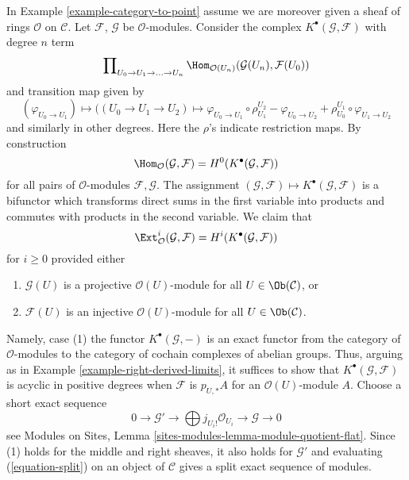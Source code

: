 \begin{example}
\label{example-computing-exts}
In Example \ref{example-category-to-point} assume we are moreover given
a sheaf of rings $\mathcal{O}$ on $\mathcal{C}$. Let
$\mathcal{F}$, $\mathcal{G}$ be $\mathcal{O}$-modules.
Consider the complex $K^\bullet(\mathcal{G}, \mathcal{F})$
with degree $n$ term
$$
\prod\nolimits_{U_0 \to U_1 \to \ldots \to U_n}
\Hom_{\mathcal{O}(U_n)}(\mathcal{G}(U_n), \mathcal{F}(U_0))
$$
and transition map given by
$$
(\varphi_{U_0 \to U_1})
\longmapsto
((U_0 \to U_1 \to U_2) \mapsto
\varphi_{U_0 \to U_1} \circ \rho^{U_2}_{U_1}
- \varphi_{U_0 \to U_2}
+ \rho^{U_1}_{U_0} \circ \varphi_{U_1 \to U_2}
$$
and similarly in other degrees. Here the $\rho$'s indicate restriction maps.
By construction
$$
\Hom_\mathcal{O}(\mathcal{G}, \mathcal{F}) =
H^0(K^\bullet(\mathcal{G}, \mathcal{F}))
$$
for all pairs of $\mathcal{O}$-modules $\mathcal{F}, \mathcal{G}$.
The assignment
$(\mathcal{G}, \mathcal{F}) \mapsto K^\bullet(\mathcal{G}, \mathcal{F})$
is a bifunctor which transforms direct sums in the first variable into
products and commutes with products in the second variable.
We claim that
$$
\Ext^i_\mathcal{O}(\mathcal{G}, \mathcal{F}) =
H^i(K^\bullet(\mathcal{G}, \mathcal{F}))
$$
for $i \geq 0$ provided either
\begin{enumerate}
\item $\mathcal{G}(U)$ is a projective $\mathcal{O}(U)$-module
for all $U \in \Ob(\mathcal{C})$, or
\item $\mathcal{F}(U)$ is an injective $\mathcal{O}(U)$-module
for all $U \in \Ob(\mathcal{C})$.
\end{enumerate}
Namely, case (1) the functor $K^\bullet(\mathcal{G}, -)$
is an exact functor from the category of $\mathcal{O}$-modules
to the category of cochain complexes of abelian groups.
Thus, arguing as in Example \ref{example-right-derived-limits},
it suffices to show that $K^\bullet(\mathcal{G}, \mathcal{F})$
is acyclic in positive degrees when $\mathcal{F}$ is $p_{U, *}A$
for an $\mathcal{O}(U)$-module $A$.
Choose a short exact sequence
\begin{equation}
\label{equation-split}
0 \to \mathcal{G}' \to \bigoplus j_{U_i!}\mathcal{O}_{U_i} \to
\mathcal{G} \to 0
\end{equation}
see Modules on Sites, Lemma \ref{sites-modules-lemma-module-quotient-flat}.
Since (1) holds for the middle and right sheaves, it also holds for
$\mathcal{G}'$ and evaluating (\ref{equation-split})
on an object of $\mathcal{C}$
gives a split exact sequence of modules.

\end{example}
